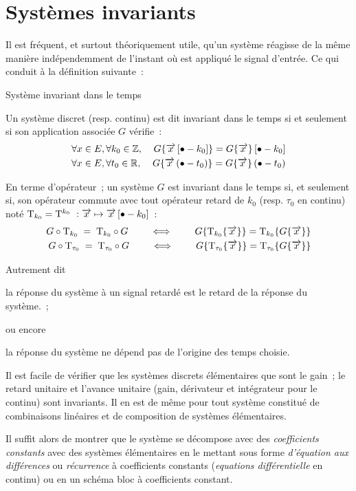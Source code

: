\section{Systèmes invariants}
Il est fréquent, et surtout théoriquement utile, qu'un système
réagisse de la même manière indépendemment de l'instant où est
appliqué le signal d'entrée. Ce qui conduit à la définition suivante~:

\begin{definition}{Système invariant dans le temps}

  Un système discret (resp. continu) est dit invariant dans le temps
  si et seulement si son application associée $G$ 
  vérifie~:
  \begin{eqnarray}
    \forall x\in E, \forall k_0\in \mathbb{Z}, \;\;\;\; G\!\left\{\overrightarrow{x}\left[\bullet-k_{0}\right]\right\} = G\!\left\{\overrightarrow{x}\right\}\left[\bullet-k_{0}\right] \\
    \forall x\in E, \forall t_0\in \mathbb{R}, \;\;\;\; G\!\left\{\overrightarrow{x}\left(\bullet-t_{0}\right)\right\} = G\!\left\{\overrightarrow{x}\right\}\left(\bullet-t_{0}\right) \nonumber
  \end{eqnarray}
  
  En terme d'opérateur~; un système $G$ est invariant dans le temps
  si, et seulement si, son opérateur commute avec tout opérateur
  retard de $k_0$ (resp. $\tau_0$ en continu) noté $\mathrm{T}_{k_0}=\mathrm{T}^{k_0}~: \overrightarrow{x} \mapsto \overrightarrow{x}\left[\bullet-k_0\right]$~:
  \begin{eqnarray}
    \label{eq:sys_invariant}
    G\circ\oretDe{k_0} \; = \; \oretDe{k_0}\circ G  \qquad \iff \qquad  G\OperDe{\oretDe{k_0}\OperDe{\x}} = \oretDe{k_0}\OperDe{G\OperDe{\x}}
    \\
    G\circ\oretDe{\tau_0} \; = \; \oretDe{\tau_0}\circ G  \qquad \iff \qquad  G\OperDe{\oretDe{\tau_0}\OperDe{\x}} = \oretDe{\tau_0}\OperDe{G\OperDe{\x}}\nonumber
  \end{eqnarray}

  \centering{}

  Autrement dit

  \og{}la réponse du système à un signal retardé est le
  retard de la réponse du système.\fg{}~;

  ou encore

  \og{} la réponse du
système ne dépend pas de l'origine des temps choisie.\fg{}
\end{definition}




\begin{remarque}
  Il est facile de vérifier que les systèmes discrets élémentaires que
  sont le gain~; le retard unitaire et l'avance unitaire (gain,
  dérivateur et intégrateur pour le continu) sont invariants.  Il en
  est de même pour tout système constitué de combinaisons linéaires et
  de composition de systèmes élémentaires.
  
  Il suffit alors de montrer que le système se décompose avec des
  \emph{coefficients constants} avec des systèmes élémentaires en le
  mettant sous forme \emph{d'équation aux différences} ou
  \emph{récurrence} à coefficients constants (\emph{equations
    différentielle} en continu) ou en un schéma bloc à coefficients
  constant.
\end{remarque}



